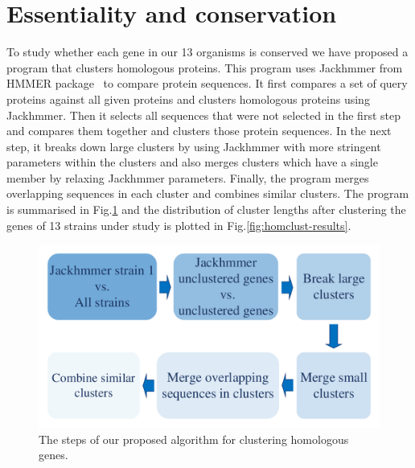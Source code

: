 \documentclass[12pt,letterpaper]{article}
\begin{document}
\section{Essentiality and conservation}
To study whether each gene in our 13 organisms is conserved we have proposed a program that clusters homologous proteins. This program uses Jackhmmer from HMMER package~\cite{eddy_accelerated_2011} to compare protein sequences. It first compares a set of query proteins against all given proteins and clusters homologous proteins using Jackhmmer. Then it selects all sequences that were not selected in the first step and compares them together and clusters those protein sequences. In the next step, it breaks down large clusters by using Jackhmmer with more stringent parameters within the clusters and also merges clusters which have a single member by relaxing Jackhmmer parameters. Finally, the program merges overlapping sequences in each cluster and combines similar clusters. The program is summarised in Fig.\@ \ref{fig:homclust} and the distribution of cluster lengths after clustering the genes of 13 strains under study is plotted in Fig.\@ \ref{fig:homclust-results}.

\begin{figure}
\includegraphics[scale=0.2]{homclust.pdf}
\caption{The steps of our proposed algorithm for clustering homologous genes.}
\label{fig:homclust}
\end{figure}
\end{document}
